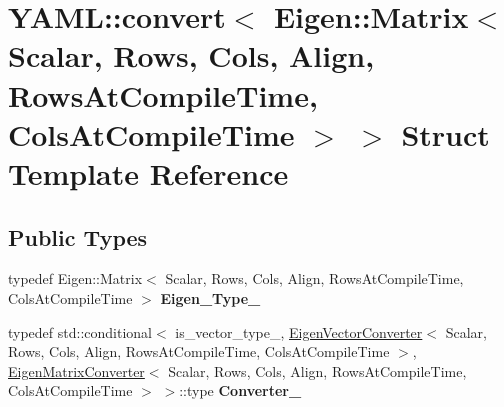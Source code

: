 \hypertarget{structYAML_1_1convert_3_01Eigen_1_1Matrix_3_01Scalar_00_01Rows_00_01Cols_00_01Align_00_01RowsAtC8665abb6da4eb6935869b0ee422ba9ce}{}\section{Y\+A\+ML\+:\+:convert$<$ Eigen\+:\+:Matrix$<$ Scalar, Rows, Cols, Align, Rows\+At\+Compile\+Time, Cols\+At\+Compile\+Time $>$ $>$ Struct Template Reference}
\label{structYAML_1_1convert_3_01Eigen_1_1Matrix_3_01Scalar_00_01Rows_00_01Cols_00_01Align_00_01RowsAtC8665abb6da4eb6935869b0ee422ba9ce}
\subsection*{Public Types}
\begin{DoxyCompactItemize}
\item 
typedef Eigen\+::\+Matrix$<$ Scalar, Rows, Cols, Align, Rows\+At\+Compile\+Time, Cols\+At\+Compile\+Time $>$ {\bfseries Eigen\+\_\+\+Type\+\_\+}\hypertarget{structYAML_1_1convert_3_01Eigen_1_1Matrix_3_01Scalar_00_01Rows_00_01Cols_00_01Align_00_01RowsAtC8665abb6da4eb6935869b0ee422ba9ce_a798e760d2b03324cecd1da2db5680c5a}{}\label{structYAML_1_1convert_3_01Eigen_1_1Matrix_3_01Scalar_00_01Rows_00_01Cols_00_01Align_00_01RowsAtC8665abb6da4eb6935869b0ee422ba9ce_a798e760d2b03324cecd1da2db5680c5a}

\item 
typedef std\+::conditional$<$ is\+\_\+vector\+\_\+type\+\_\+, \hyperlink{structYAML_1_1EigenVectorConverter}{Eigen\+Vector\+Converter}$<$ Scalar, Rows, Cols, Align, Rows\+At\+Compile\+Time, Cols\+At\+Compile\+Time $>$, \hyperlink{structYAML_1_1EigenMatrixConverter}{Eigen\+Matrix\+Converter}$<$ Scalar, Rows, Cols, Align, Rows\+At\+Compile\+Time, Cols\+At\+Compile\+Time $>$ $>$\+::type {\bfseries Converter\+\_\+}\hypertarget{structYAML_1_1convert_3_01Eigen_1_1Matrix_3_01Scalar_00_01Rows_00_01Cols_00_01Align_00_01RowsAtC8665abb6da4eb6935869b0ee422ba9ce_a88ccaf7da608e0afffffd7248f54b75a}{}\label{structYAML_1_1convert_3_01Eigen_1_1Matrix_3_01Scalar_00_01Rows_00_01Cols_00_01Align_00_01RowsAtC8665abb6da4eb6935869b0ee422ba9ce_a88ccaf7da608e0afffffd7248f54b75a}

\end{DoxyCompactItemize}
